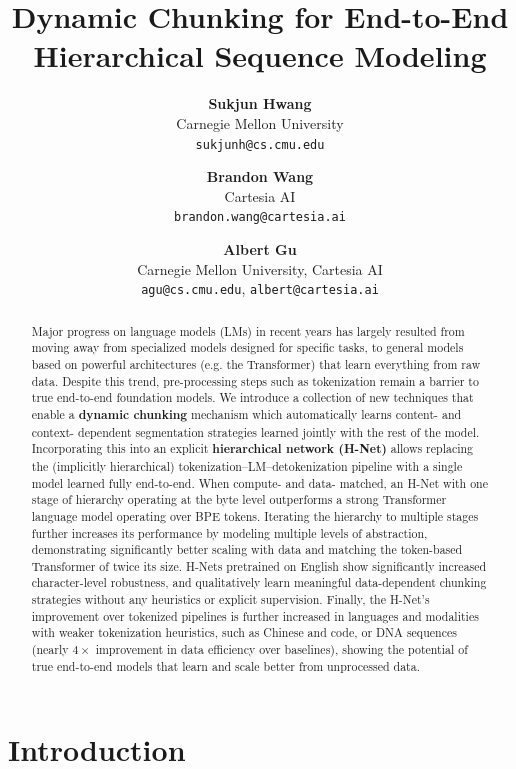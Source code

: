 \documentclass{article}
\title{Dynamic Chunking for End-to-End Hierarchical Sequence Modeling}
\date{}
\author{
    \textbf{Sukjun Hwang} \\
    Carnegie Mellon University \\
    \texttt{sukjunh@cs.cmu.edu} \\
    \and
    \textbf{Brandon Wang} \\
    Cartesia AI\\
    \texttt{brandon.wang@cartesia.ai}\\
    \and
    \textbf{Albert Gu} \\
    Carnegie Mellon University, Cartesia AI\\
    \texttt{agu@cs.cmu.edu}, \texttt{albert@cartesia.ai}\\
}
\theoremstyle{plain}
\theoremstyle{remark}
\begin{document}
\maketitle

\begin{abstract}
\noindent
Major progress on language models (LMs) in recent years has largely resulted from moving away from specialized models designed for specific tasks,
to general models based on powerful architectures (e.g. the Transformer) that learn everything from raw data.
Despite this trend, pre-processing steps such as tokenization remain a barrier to true end-to-end foundation models.
We introduce a collection of new techniques that enable a \textbf{dynamic chunking} mechanism which automatically learns content- and context- dependent segmentation strategies learned jointly with the rest of the model.
Incorporating this into an explicit \textbf{hierarchical network (H-Net)} allows replacing the (implicitly hierarchical) tokenization--LM--detokenization pipeline with a single model learned fully end-to-end.
When compute- and data- matched, an H-Net with one stage of hierarchy operating at the byte level outperforms a strong Transformer language model operating over BPE tokens.
Iterating the hierarchy to multiple stages further increases its performance by modeling multiple levels of abstraction, demonstrating significantly better scaling with data and matching the token-based Transformer of twice its size.
H-Nets pretrained on English show significantly increased character-level robustness, and qualitatively learn meaningful data-dependent chunking strategies without any heuristics or explicit supervision.
Finally, the H-Net's improvement over tokenized pipelines is further increased in languages and modalities with weaker tokenization heuristics, such as Chinese and code, or DNA sequences (nearly $4\times$ improvement in data efficiency over baselines),
showing the potential of true end-to-end models that learn and scale better from unprocessed data.
\end{abstract}

\section{Introduction}
\label{sec: introduction}
\end{document}
